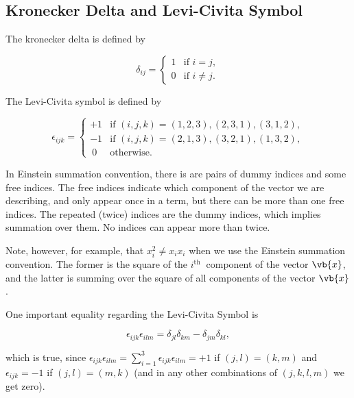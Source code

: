 \documentclass[a4paper,12pt]{report}
\begin{document}
\subsection{Kronecker Delta and Levi-Civita Symbol}

The kronecker delta is defined by 

\begin{equation}
\delta_{ij} =
\begin{cases} 
1 & \text{if } i = j, \\
0 & \text{if } i \neq j.
\end{cases}
\end{equation}

The Levi-Civita symbol is defined by 

\begin{equation}
    \epsilon_{ijk} =
\begin{cases} 
+1 & \text{if } (i, j, k) = (1, 2, 3), (2, 3, 1), (3, 1, 2), \\
-1 & \text{if } (i, j, k) = (2, 1, 3), (3, 2, 1), (1, 3, 2), \\
~0 & \text{otherwise}.
\end{cases}
\end{equation}

In Einstein summation convention, there is are pairs of dummy indices and some free indices. The free indices indicate which component of the vector we are describing, and only appear once in a term, but there can be more than one free indices. The repeated (twice) indices are the dummy indices, which implies summation over them. No indices can appear more than twice. 

Note, however, for example, that \(x_{i}^2 \neq x_{i}x_{i}   \) when we use the Einstein summation convention. The former is the square of the \(i^{\text{th }} \) component of the vector \(\vb{x} \), and the latter is summing over the square of all components of the vector \(\vb{x} \).    

One important equality regarding the Levi-Civita Symbol is 

\begin{equation}
    \epsilon _{ijk}\epsilon _{ilm} = \delta _{jl}\delta _{km} - \delta _{jm}\delta _{kl},      
\end{equation}

which is true, since \(\epsilon _{ijk}\epsilon _{ilm} = \sum_{i=1}^{3} \epsilon _{ijk}\epsilon _{ilm} = +1  \) if \((j,l) = (k,m)\) and \(\epsilon _{ijk} = -1 \) if \((j,l) = (m,k)\) (and in any other combinations of \((j,k,l,m)\) we get zero).
\end{document}

